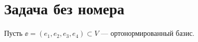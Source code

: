 \section{Задача без номера}

Пусть $\ee = (e_1, e_2, e_3, e_4) \subset V$ --- ортонормированный базис.



